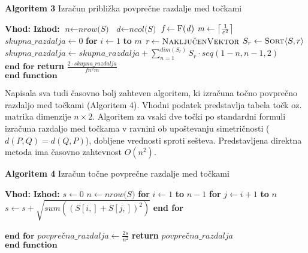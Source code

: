 \documentclass[12pt,a4paper]{amsart}
\theoremstyle{definition} %
\theoremstyle{plain} %
\DeclarePairedDelimiter\ceil{\lceil}{\rceil}
\begin{document}
\begin{algorithm}[H]
\caption{\textbf{Algoritem 3} Izračun približka povprečne razdalje med točkami}\label{priblizek}
\begin{algorithmic}[1]
\Statex\textbf{Vhod:}  
\Statex\textbf{Izhod:} 
\State $\textit{n} \gets \textit{nrow(S)}$
\State $\textit{d} \gets \textit{ncol(S)}$
\State $\textit{f} \gets \text{F(\textit{d})}$
\State $\textit{m} \gets \ceil*{\frac{1}{\varepsilon^2}}$
\State $\textit{skupna\_razdalja} \gets 0$
\State \textbf{for} $\textit{i} \gets 1$ \textbf{to} $\textit{m}$
	\State \hspace{6mm} $\textit{r} \gets \textproc{NaključenVektor}$
	\State\hspace{6mm} $S_{r} \gets \textproc{Sort} \langle S, r\rangle$ 
	\State \hspace{6mm}$\textit{skupna\_razdalja} \gets \textit{skupna\_razdalja} + \sum\limits_{n=1}^{dim(S_r)} S_{r} \cdot \textit{seq}(1-n,n-1,2)$ 
\State $\textbf{end for}$
\State \textbf{return} $\frac{2 \cdot \textit{skupna\_razdalja}}{fn^2m}$ \\
$\textbf{end function}$
\EndFunction 
\end{algorithmic}
\end{algorithm}

Napisala sva tudi časovno bolj zahteven algoritem, ki izračuna točno povprečno razdaljo med točkami (Algoritem 4). Vhodni podatek predstavlja tabela točk oz. matrika dimenzije $n \times 2$. Algoritem za vsaki dve točki po standardni formuli izračuna razdaljo med točkama v ravnini ob upoštevanju simetričnosti ($d(P,Q) = d(Q,P)$), dobljene vrednosti sproti sešteva. Predstavljena direktna metoda ima časovno zahtevnost $O(n^2)$. 

\begin{algorithm}[H]
\caption{\textbf{Algoritem 4} Izračun točne povprečne razdalje med točkami}\label{tocna}
\begin{algorithmic}[1]
\Statex\textbf{Vhod:} 
\Statex\textbf{Izhod:} 
\State $\textit{s} \gets 0$
\State $n \gets \textit{nrow(S)}$
\State \textbf{for} $\textit{i} \gets 1$ \textbf{to} $\textit{n} - 1$
	\State \hspace{6mm} \textbf{for} $\textit{j} \gets i +1 $ \textbf{to} $\textit{n}$
		\State \hspace{12mm} $\textit{s} \gets \textit{s} + \sqrt{ sum ((S[i,]+S[j,])^2)}$
 \State \hspace{6mm}	 \textbf{end for}

\State $\textbf{end for}$
\State $\textit{povprečna\_razdalja} \gets \frac{2s}{n^2}$
\State \textbf{return} $\textit{povprečna\_razdalja}$ \\
$\textbf{end function}$
\EndFunction
\end{algorithmic}
\end{algorithm}
\end{document}
